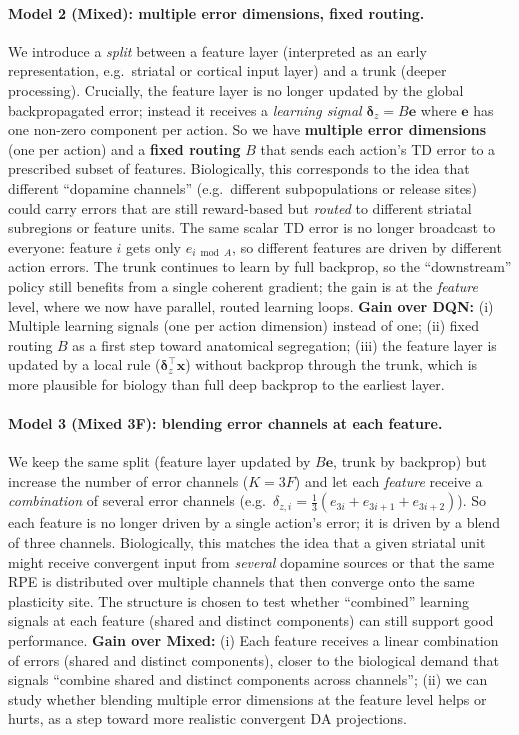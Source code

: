 \documentclass[11pt]{article}
\begin{document}
\paragraph{Model 2 (Mixed): multiple error dimensions, fixed routing.} We introduce a \emph{split} between a feature layer (interpreted as an early representation, e.g.\ striatal or cortical input layer) and a trunk (deeper processing). Crucially, the feature layer is no longer updated by the global backpropagated error; instead it receives a \emph{learning signal} $\boldsymbol{\delta}_z = B\mathbf{e}$ where $\mathbf{e}$ has one non-zero component per action. So we have \textbf{multiple error dimensions} (one per action) and a \textbf{fixed routing} $B$ that sends each action's TD error to a prescribed subset of features. Biologically, this corresponds to the idea that different ``dopamine channels'' (e.g.\ different subpopulations or release sites) could carry errors that are still reward-based but \emph{routed} to different striatal subregions or feature units. The same scalar TD error is no longer broadcast to everyone: feature $i$ gets only $e_{i \bmod A}$, so different features are driven by different action errors. The trunk continues to learn by full backprop, so the ``downstream'' policy still benefits from a single coherent gradient; the gain is at the \emph{feature} level, where we now have parallel, routed learning loops. \textbf{Gain over DQN:} (i) Multiple learning signals (one per action dimension) instead of one; (ii) fixed routing $B$ as a first step toward anatomical segregation; (iii) the feature layer is updated by a local rule ($\boldsymbol{\delta}_z^{\top} \mathbf{x}$) without backprop through the trunk, which is more plausible for biology than full deep backprop to the earliest layer.

\paragraph{Model 3 (Mixed 3F): blending error channels at each feature.} We keep the same split (feature layer updated by $B\mathbf{e}$, trunk by backprop) but increase the number of error channels ($K = 3F$) and let each \emph{feature} receive a \emph{combination} of several error channels (e.g.\ $\delta_{z,i} = \frac{1}{3}(e_{3i}+e_{3i+1}+e_{3i+2})$). So each feature is no longer driven by a single action's error; it is driven by a blend of three channels. Biologically, this matches the idea that a given striatal unit might receive convergent input from \emph{several} dopamine sources or that the same RPE is distributed over multiple channels that then converge onto the same plasticity site. The structure is chosen to test whether ``combined'' learning signals at each feature (shared and distinct components) can still support good performance. \textbf{Gain over Mixed:} (i) Each feature receives a linear combination of errors (shared and distinct components), closer to the biological demand that signals ``combine shared and distinct components across channels''; (ii) we can study whether blending multiple error dimensions at the feature level helps or hurts, as a step toward more realistic convergent DA projections.
\end{document}
